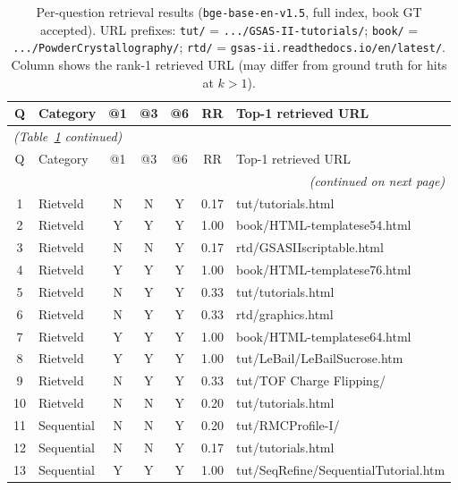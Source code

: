 \documentclass[12pt,a4paper]{article}
\begin{document}
\begin{longtable}{clcccc>{\raggedright\footnotesize\arraybackslash}p{5.8cm}}
  \caption{Per-question retrieval results (\texttt{bge-base-en-v1.5}, full
           index, book GT accepted).
           URL prefixes: \texttt{tut/} =
           \texttt{.../GSAS-II-tutorials/};
           \texttt{book/} = \texttt{.../PowderCrystallography/};
           \texttt{rtd/} = \texttt{gsas-ii.readthedocs.io/en/latest/}.
           Column shows the rank-1 retrieved URL (may differ from ground
           truth for hits at $k>1$).}
  \label{tab:perquestion} \\
  \toprule
  Q & Category & @1 & @3 & @6 & RR & Top-1 retrieved URL \\
  \midrule
  \endfirsthead
  \multicolumn{7}{l}{\small\textit{(Table~\ref{tab:perquestion} continued)}} \\
  \toprule
  Q & Category & @1 & @3 & @6 & RR & Top-1 retrieved URL \\
  \midrule
  \endhead
  \midrule
  \multicolumn{7}{r}{\small\textit{(continued on next page)}} \\
  \endfoot
  \bottomrule
  \endlastfoot
   1 & Rietveld    & N & N & Y & 0.17 & tut/tutorials.html \\
   2 & Rietveld    & Y & Y & Y & 1.00 & book/HTML-templatese54.html \\
   3 & Rietveld    & N & N & Y & 0.17 & rtd/GSASIIscriptable.html \\
   4 & Rietveld    & Y & Y & Y & 1.00 & book/HTML-templatese76.html \\
   5 & Rietveld    & N & Y & Y & 0.33 & tut/tutorials.html \\
   6 & Rietveld    & N & Y & Y & 0.33 & rtd/graphics.html \\
   7 & Rietveld    & Y & Y & Y & 1.00 & book/HTML-templatese64.html \\
   8 & Rietveld    & Y & Y & Y & 1.00 & tut/LeBail/LeBailSucrose.htm \\
   9 & Rietveld    & N & Y & Y & 0.33 & tut/TOF Charge Flipping/ \\
  10 & Rietveld    & N & N & Y & 0.20 & tut/tutorials.html \\
  11 & Sequential  & N & N & Y & 0.20 & tut/RMCProfile-I/ \\
  12 & Sequential  & N & N & Y & 0.17 & tut/tutorials.html \\
  13 & Sequential  & Y & Y & Y & 1.00 & tut/SeqRefine/SequentialTutorial.htm \\

\end{longtable}
\end{document}

